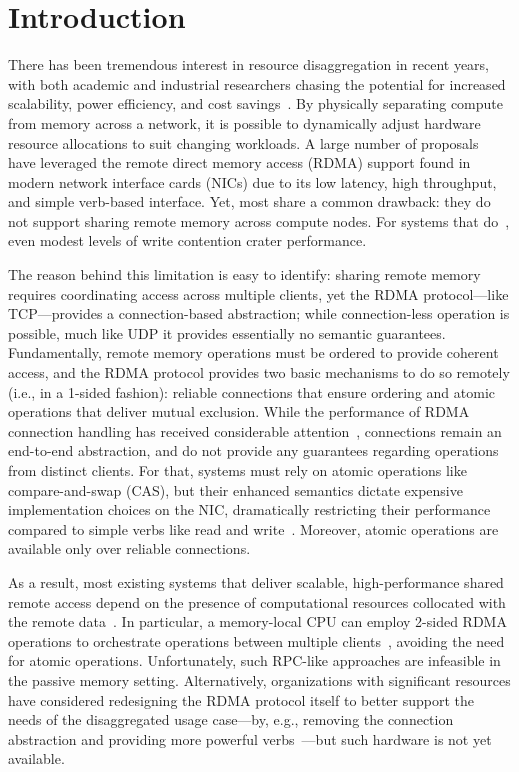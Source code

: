 \section{Introduction}

There has been tremendous interest in resource
disaggregation in recent years, with both academic and
industrial researchers chasing the potential for increased
scalability, power efficiency, and cost
savings~\cite{blade-server,rethinking,the-machine,requirements,clio-arxiv,firebox,leap,zombieland,storm,aifm,supernic}.
By physically separating compute from memory across a
network, it is possible to dynamically adjust hardware
resource allocations to suit changing workloads.  A large
number of
proposals~\cite{infiniswap,fastswap,legoos,clover,sherman,farm,reigons,fusee}
have leveraged the remote direct memory access (RDMA)
support found in modern network interface cards (NICs) due
to its low latency, high throughput, and simple verb-based
interface.  Yet, most share a common drawback: they do not
support sharing remote memory across compute nodes.  For
systems that do~\cite{clover,sherman,fusee}, even modest levels of write
contention crater performance.

The reason behind this limitation is easy to identify: sharing remote
memory requires coordinating access across multiple clients, yet the
RDMA protocol---like TCP---provides a connection-based abstraction;
while connection-less operation is possible, much like UDP it provides
essentially no semantic guarantees.  Fundamentally, remote memory
operations must be ordered to provide coherent access, and the RDMA
protocol provides two basic mechanisms to do so remotely (i.e., in a
1-sided fashion): reliable connections that ensure ordering and atomic
operations that deliver mutual exclusion.  While the performance of
RDMA connection handling has received considerable attention~\cite{farm,storm,scalerpc},
connections remain an end-to-end abstraction, and do not provide any
guarantees regarding operations from distinct clients.  For that,
systems must rely on atomic operations like compare-and-swap (CAS),
but their enhanced semantics dictate expensive implementation choices
on the NIC, dramatically restricting their performance compared to
simple verbs like read and write~\cite{design-guidelines}.  Moreover,
atomic operations are available only over reliable connections.

As a result, most existing systems that deliver scalable,
high-performance shared remote access depend on the presence of
computational resources collocated with the remote
data~\cite{herd,cell,farm,pilaf,storm}.  In particular, a
memory-local CPU can employ 2-sided RDMA operations to orchestrate
operations between multiple clients~\cite{herd,fasst}, avoiding the need
for atomic operations.  Unfortunately, such RPC-like approaches are
infeasible in the passive memory setting.  Alternatively,
organizations with significant resources have considered redesigning
the RDMA protocol itself to better support the needs of the
disaggregated usage case---by, e.g., removing the connection
abstraction and providing more powerful verbs~\cite{filemr,rma,star}---but such
hardware is not yet available.

